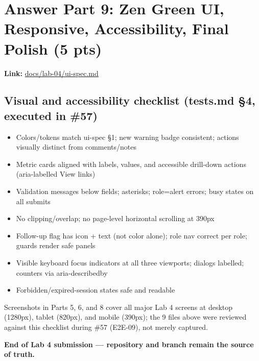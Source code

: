 \documentclass[11pt,a4paper]{article}
\begin{document}
\section*{Answer Part 9: Zen Green UI, Responsive, Accessibility, Final Polish (5 pts)}

\textbf{Link:} \href{https://github.com/thhanabun/Software\_Eng\_Lab/blob/main/docs/lab-04/ui-spec.md}{docs/lab-04/ui-spec.md}

\subsection*{Visual and accessibility checklist (tests.md \S4, executed in \#57)}
\begin{itemize}
\item Colors/tokens match ui-spec \S1; new warning badge consistent; actions visually distinct from comments/notes
\item Metric cards aligned with labels, values, and accessible drill-down actions (aria-labelled View links)
\item Validation messages below fields; asterisks; role=alert errors; busy states on all submits
\item No clipping/overlap; no page-level horizontal scrolling at 390px
\item Follow-up flag has icon + text (not color alone); role nav correct per role; guards render safe panels
\item Visible keyboard focus indicators at all three viewports; dialogs labelled; counters via aria-describedby
\item Forbidden/expired-session states safe and readable
\end{itemize}

\noindent Screenshots in Parts 5, 6, and 8 cover all major Lab 4 screens at desktop (1280px),
tablet (820px), and mobile (390px); the 9 files above were reviewed against this checklist
during \#57 (E2E-09), not merely captured.

\vspace{2em}
\begin{center}
\small\textcolor{tggreen}{\textbf{End of Lab 4 submission --- repository and  branch remain the source of truth.}}
\end{center}
\end{document}
